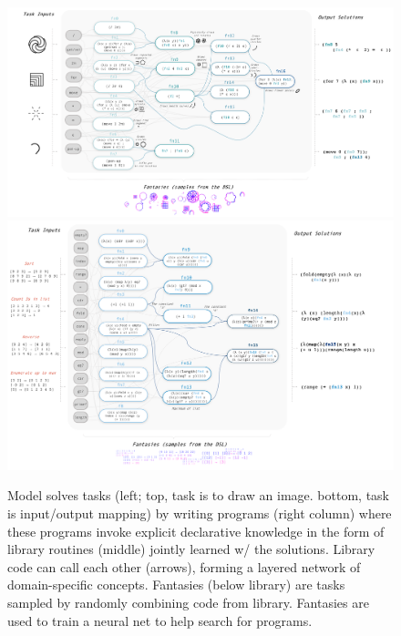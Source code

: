 \documentclass{article}
\begin{document}
\begin{figure}
  \includegraphics[width = \textwidth]{figures/DeepLogo_4_15}
  \includegraphics[width = \textwidth]{figures/DeepList_4_17}
  \caption{Model solves tasks (left; top, task is to draw an image. bottom, task is input/output mapping) by writing programs (right column) where these programs invoke explicit declarative knowledge in the form of library routines (middle) jointly learned w/ the solutions. Library code can call each other (arrows), forming a layered network of domain-specific concepts. Fantasies (below library) are tasks sampled by randomly combining code from library. Fantasies are used to train a neural net to help search for programs.}\label{exampleDSL}
\end{figure}






\end{document}
